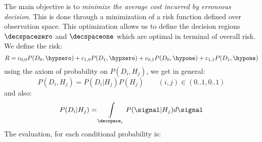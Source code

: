 The main objective is to \emph{minimize the average cost incurred by erroneous decision}. This is done through a minimization of a risk function defined over observation space. This optimization allows us to define the decision regions $\decspacezero$ and $\decspaceone$ which are optimal in terminal of overall risk. We define the risk:
\begin{equation}
R = c_{0,0} P(D_0, \hypzero) + c_{1,0} P(D_1, \hypzero) + c_{0,1} P(D_0, \hypone) + c_{1,1} P(D_1, \hypone)
\end{equation}
using the axiom of probability on $P(D_i,H_j)$, we get in general:
\begin{equation}
P(D_i,H_j) = P(D_i|H_j) P(H_j) \qquad (i,j) \in (0..1,0..1)
\end{equation}
and also:
\begin{equation}
P(D_i|H_j) = \int\limits_{\decspace_i}P(\signal|H_j)d\signal
\end{equation}
The evaluation, for each conditional probability is:
